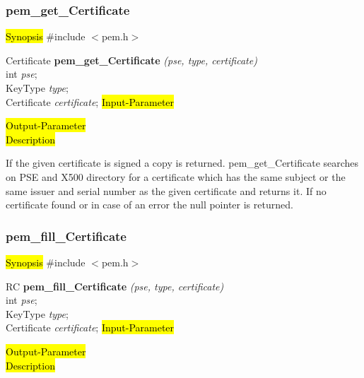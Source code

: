  

\subsubsection{pem\_get\_Certificate}
\label{pem_get_Certificate}
\hl{Synopsis}
\#include $<$pem.h$>$ 

Certificate {\bf *pem\_get\_Certificate} {\em (pse, type, certificate)} \\
int {\em pse}; \\
KeyType {\em type}; \\
Certificate {\em *certificate};
\hl{Input-Parameter}


\hl{Output-Parameter}
 \\
\hl{Description}

If the given certificate is signed a copy is returned.
pem\_get\_Certificate searches on PSE and X500 directory for a certificate
which has the same subject or the same issuer and serial number as the 
given certificate and returns it. If no certificate found or in case
of an error the null pointer is returned.







 

\subsubsection{pem\_fill\_Certificate}
\label{pem_fill_Certificate}
\hl{Synopsis}
\#include $<$pem.h$>$ 

RC {\bf *pem\_fill\_Certificate} {\em (pse, type, certificate)} \\
int {\em pse}; \\
KeyType {\em type}; \\
Certificate {\em *certificate};
\hl{Input-Parameter}


\hl{Output-Parameter}
 \\
\hl{Description}

